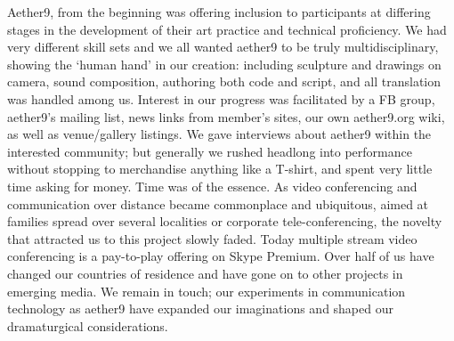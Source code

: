 Aether9, from the beginning was offering inclusion to participants at differing stages in the development of their art practice and technical proficiency. We had very different skill sets and we all wanted aether9 to be truly multidisciplinary, showing the ‘human hand’ in our creation: including sculpture and drawings on camera, sound composition, authoring both code and script, and all translation was handled among us. Interest in our progress was facilitated by a FB group, aether9's mailing list, news links from member's sites, our own aether9.org wiki, as well as venue/gallery listings. We gave interviews about aether9 within the interested community; but generally we rushed headlong into performance without stopping to merchandise anything like a T-shirt, and spent very little time asking for money. Time was of the essence. As video conferencing and communication over distance became commonplace and ubiquitous, aimed at families spread over several localities or corporate tele-conferencing, the novelty that attracted us to this project slowly faded. Today multiple stream video conferencing is a pay-to-play offering on Skype Premium. Over half of us have changed our countries of residence and have gone on to other projects in emerging media. We remain in touch; our experiments in communication technology as aether9 have expanded our imaginations and shaped our dramaturgical considerations.
 
 
 
